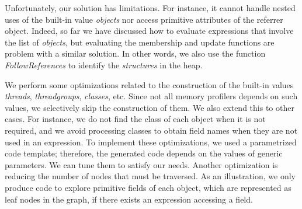 Unfortunately, our solution has limitations.
For instance, it cannot handle nested uses of the built-in value \textit{objects} nor access primitive attributes of the referrer object.
Indeed, so far we have discussed how to evaluate expressions that involve the list of \textit{objects}, but evaluating the membership and update functions are problem with a similar solution.
In other words, we also use the function \textit{FollowReferences} to identify the \textit{structures} in the heap.

We perform some optimizations related to the construction of the built-in values \textit{threads}, \textit{threadgroups}, \textit{classes}, etc. 
Since not all memory profilers depends on such values, we selectively skip the construction of them.
We also extend this to other cases. For instance, we do not find the class of each object when it is not required, and we avoid processing classes to obtain field names when they are not used in an expression.
To implement these optimizations, we used a parametrized code template; therefore, the generated code depends on the values of generic parameters. 
We can tune them to satisfy our needs.
Another optimization is reducing the number of nodes that must be traversed.
As an illustration, we only produce code to explore primitive fields of each object, which are represented as leaf nodes in the graph, if there exists an expression accessing a field.


